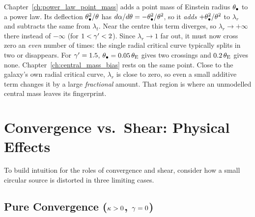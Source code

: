 \begin{bridge}
Chapter~\ref{ch:power_law_point_mass} adds a point mass of Einstein radius
$\theta_{\bullet}$ to a power law. Its deflection $\theta_{\bullet}^2/\theta$ has
$d\alpha/d\theta = -\theta_{\bullet}^2/\theta^2$, so it \emph{adds} $+\theta_{\bullet}^2/\theta^2$
to $\lambda_r$ and subtracts the same from $\lambda_t$. Near the centre this
term diverges, so $\lambda_r \to +\infty$ there instead of $-\infty$ (for $1 < \gamma' < 2$). Since
$\lambda_r \to 1$ far out, it must now cross zero an \emph{even} number of
times: the single radial critical curve typically splits in two or disappears.
For $\gamma' = 1.5$, $\theta_{\bullet} = 0.05\,\theta_{\mathrm{E}}$ gives two crossings and
$0.2\,\theta_{\mathrm{E}}$ gives none. Chapter~\ref{ch:central_mass_bias} rests on the same
point. Close to the galaxy's own radial critical curve, $\lambda_r$ is close to zero,
so even a small additive term changes it by a large \emph{fractional} amount.
That region is where an unmodelled central mass leaves its fingerprint.
\end{bridge}


\section{Convergence vs.\ Shear: Physical Effects}
\label{sec:kappa_vs_gamma}

To build intuition for the roles of convergence and shear, consider
how a small circular source is distorted in three limiting cases.

\subsection{Pure Convergence ($\kappa > 0$, $\gamma = 0$)}

